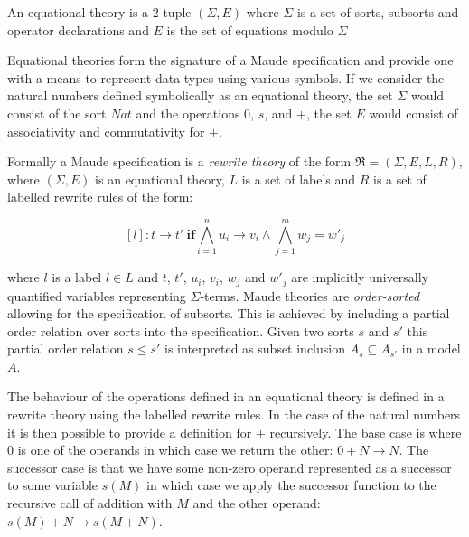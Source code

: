\medskip
\begin{mydef}
An equational theory is a 2 tuple $(\Sigma, E)$ where $\Sigma$ is a set of sorts, subsorts and operator declarations  and $E$ is the set of equations modulo $\Sigma$
\end{mydef}
Equational theories \cite{JM98} form the signature of a Maude specification and provide one with a means to represent data types using various symbols. If we consider the natural numbers defined symbolically  as an equational theory, the set $\Sigma$ would consist of the sort $Nat$ and the operations $0$, $s$, and $+$, the set $E$ would consist of associativity and commutativity for $+$.

Formally a Maude specification is a \emph{rewrite theory} \cite{JM98} of the form $\mathfrak{R}=(\Sigma,E,L,R)$, where  $(\Sigma, E)$ is an equational theory, $L$ is a set of labels and $R$ is a set of labelled rewrite rules of the form:

$$ [l] : t \to t' \ \mathbf{if} \bigwedge^{n}_{i = 1} u_i \to v_i  \wedge \bigwedge^{m}_{j = 1} w_j = w'_j $$

where $l$ is a label $l \in L$ and $t$, $t'$, $u_i$, $v_i$, $w_j$ and $w'_j$ are implicitly universally quantified variables representing $\Sigma$-terms. Maude theories are \emph{order-sorted} allowing for the specification of subsorts. This is achieved by including a partial order relation over sorts into the specification. Given two sorts $s$ and $s'$ this partial order relation $s \leq s'$ is interpreted as subset inclusion $A_s \subseteq A_{s'}$ in a model $A$.

The behaviour of the operations defined in an equational theory is defined in a rewrite theory using the labelled rewrite rules. In the case of the natural numbers it is then possible to provide a definition for $+$ recursively. The base case is where $0$ is one of the operands in which case we return the other: $0 + N \to N$. The successor case is that we have some non-zero operand represented as a successor to some variable $s(M)$ in which case we apply the successor function to the recursive call of addition with $M$ and the other operand: $s(M) + N \to s(M + N)$. 
 

